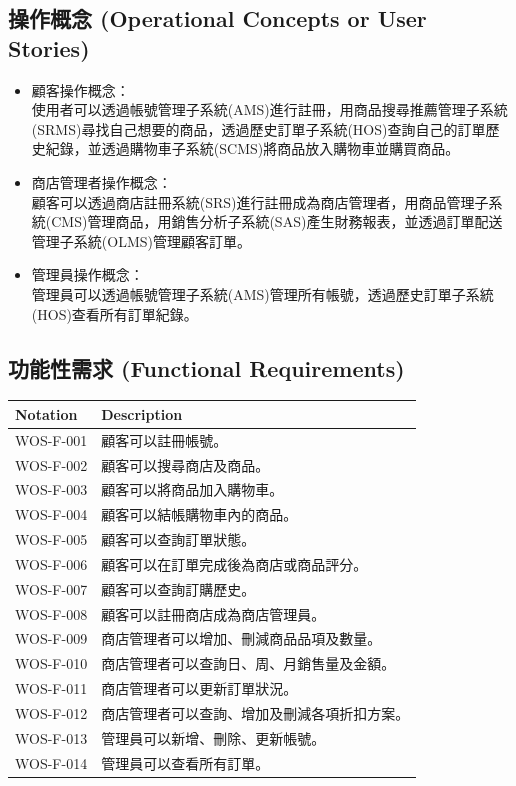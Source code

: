 \documentclass[a4paper, 12pt]{article}
\begin{document}
\subsection{操作概念 (Operational Concepts or User Stories)}
\begin{itemize}
 
\item 顧客操作概念： \\
\setlength{\parindent}{2em} 使用者可以透過帳號管理子系統(AMS)進行註冊，用商品搜尋推薦管理子系統(SRMS)尋找自己想要的商品，透過歷史訂單子系統(HOS)查詢自己的訂單歷史紀錄，並透過購物車子系統(SCMS)將商品放入購物車並購買商品。
\item 商店管理者操作概念： \\
\setlength{\parindent}{2em} 顧客可以透過商店註冊系統(SRS)進行註冊成為商店管理者，用商品管理子系統(CMS)管理商品，用銷售分析子系統(SAS)產生財務報表，並透過訂單配送管理子系統(OLMS)管理顧客訂單。
\item 管理員操作概念： \\
\setlength{\parindent}{2em} 管理員可以透過帳號管理子系統(AMS)管理所有帳號，透過歷史訂單子系統(HOS)查看所有訂單紀錄。

\end{itemize}

\subsection{功能性需求 (Functional Requirements)}

\noindent \begin{tabular}{ | p{6.5em} | p{32em} |}
  \hline
  Notation & Description \\
  \hline
  WOS-F-001 & 顧客可以註冊帳號。 \\
  \hline
  WOS-F-002 & 顧客可以搜尋商店及商品。 \\
  \hline
  WOS-F-003 & 顧客可以將商品加入購物車。 \\
  \hline
  WOS-F-004 & 顧客可以結帳購物車內的商品。 \\
  \hline
  WOS-F-005 & 顧客可以查詢訂單狀態。 \\
  \hline
  WOS-F-006 & 顧客可以在訂單完成後為商店或商品評分。 \\
  \hline
  WOS-F-007 & 顧客可以查詢訂購歷史。 \\
  \hline
  WOS-F-008 & 顧客可以註冊商店成為商店管理員。 \\
  \hline
  WOS-F-009 & 商店管理者可以增加、刪減商品品項及數量。 \\
  \hline
  WOS-F-010 & 商店管理者可以查詢日、周、月銷售量及金額。 \\
  \hline
  WOS-F-011 & 商店管理者可以更新訂單狀況。 \\
  \hline
  WOS-F-012 & 商店管理者可以查詢、增加及刪減各項折扣方案。 \\
  \hline
  WOS-F-013 & 管理員可以新增、刪除、更新帳號。 \\
  \hline
  WOS-F-014 & 管理員可以查看所有訂單。 \\
  \hline
\end{tabular} \par
\end{document}

